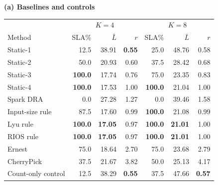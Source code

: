 \caption{Live panel under CPU load ($K=4,8$). Each block reports SLA share, mean latency (s), and core-hour ratio to same-load Static-4. $K$ is the number of CPU-spinning processes. PRISM uses idle-trained predictors with the measured capacity-cap configuration; CPU burners hold no executor slots. Bold: panel-wise optima (higher SLA; lower other metrics), with displayed ties retained.}\label{tab:load}\centering\scriptsize
\setlength{\tabcolsep}{2pt}\renewcommand{\arraystretch}{1.06}
\begin{minipage}[t]{.485\textwidth}\centering\textbf{(a) Baselines and controls}\par\smallskip
\begin{tabular*}{\linewidth}{@{\extracolsep{\fill}}lrrrrrr@{}}
\toprule
 & \multicolumn{3}{c}{\mbox{$K=4$}} & \multicolumn{3}{c}{\mbox{$K=8$}}\\
\mbox{Method} & \mbox{SLA\%} & \mbox{$\bar L$} & \mbox{$r$} & \mbox{SLA\%} & \mbox{$\bar L$} & \mbox{$r$}\\\midrule
Static-1 & 12.5 & 38.91 & \textbf{0.55} & 25.0 & 48.76 & 0.58\\
Static-2 & 50.0 & 20.93 & 0.60 & 37.5 & 28.42 & 0.68\\
Static-3 & \textbf{100.0} & 17.74 & 0.76 & 75.0 & 23.35 & 0.83\\
Static-4 & \textbf{100.0} & 17.53 & 1.00 & \textbf{100.0} & 21.04 & 1.00\\
Spark DRA & 0.0 & 27.28 & 1.27 & 0.0 & 39.46 & 1.58\\
Input-size rule & 87.5 & 17.60 & 0.99 & \textbf{100.0} & 21.08 & 0.99\\
Lyu rule & \textbf{100.0} & \textbf{17.05} & 0.97 & \textbf{100.0} & \textbf{21.01} & 1.00\\
RIOS rule & \textbf{100.0} & \textbf{17.05} & 0.97 & \textbf{100.0} & \textbf{21.01} & 1.00\\
Ernest & 75.0 & 18.64 & 2.70 & 75.0 & 23.68 & 2.79\\
CherryPick & 37.5 & 21.67 & 3.82 & 50.0 & 25.13 & 4.17\\
Count-only control & 12.5 & 38.29 & \textbf{0.55} & 37.5 & 47.66 & \textbf{0.57}\\
\bottomrule\end{tabular*}\end{minipage}
\hfill
